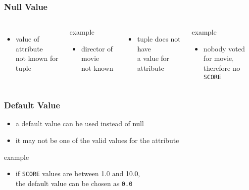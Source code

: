 \documentclass[dvipsnames]{beamer}
\theoremstyle{plain}
\begin{document}
\begin{frame}
  \frametitle{Null Value}

  \begin{columns}[t]
    \begin{itemize}
      \item value of attribute\\
	not known for tuple
    \end{itemize}

    \medskip
    \begin{exampleblock}{example}
      \begin{itemize}
        \item director of movie\\
	  not known
      \end{itemize}
    \end{exampleblock}

    \pause
    \begin{itemize}
      \item tuple does not have\\
        a value for attribute
    \end{itemize}

    \medskip
    \begin{exampleblock}{example}
      \begin{itemize}
        \item nobody voted for movie,\\
	  therefore no \texttt{SCORE}
      \end{itemize}
    \end{exampleblock}
  \end{columns}
\end{frame}

\begin{frame}
  \frametitle{Default Value}

  \begin{itemize}
    \item a default value can be used instead of null
    \item it may not be one of the valid values for the attribute
  \end{itemize}

  \medskip
  \begin{exampleblock}{example}
    \begin{itemize}
      \item if \texttt{SCORE} values are between 1.0 and 10.0,\\
	the default value can be chosen as \texttt{0.0}
    \end{itemize}
  \end{exampleblock}
\end{frame}
\end{document}
